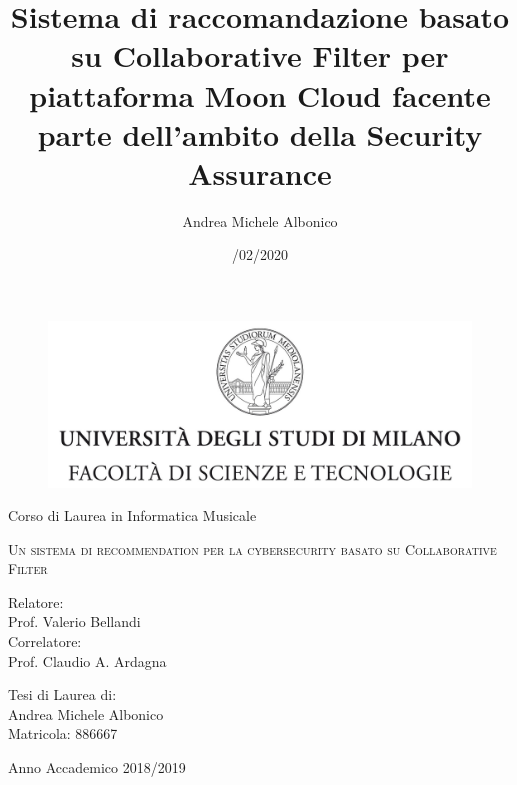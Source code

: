 \documentclass[12pt,fleqn,twoside,a4paper]{book}
\title{Sistema di raccomandazione basato su Collaborative Filter per piattaforma Moon Cloud 
facente parte dell'ambito della Security Assurance}
\author{Andrea Michele Albonico}
\date{/02/2020}
\begin{document}
\frontmatter

\begin{titlepage}
    \begin{figure}
        \centering
        \includegraphics[height=5.0 cm]{logo.jpg}
        \vspace{0.5 cm}
    \end{figure}
    \begin{center}
        {\Large Corso di Laurea in Informatica Musicale}
    \end{center}
    \begin{center}
        \vspace{2 cm}
        {\Large \textsc{Un sistema di recommendation per la cybersecurity basato su Collaborative Filter}}
    \end{center}
    \par
    \vspace{2 cm}
    \begin{flushleft}
        Relatore:\\ Prof. Valerio Bellandi\\
        \noindent Correlatore:\\ Prof. Claudio A. Ardagna
    \end{flushleft}
    \vspace{1 cm}
    \begin{flushright}
        Tesi di Laurea di:\\ Andrea Michele Albonico\\ Matricola: 886667
    \end{flushright}
    \vfill
    \vspace{1.5 cm}
    \begin{center}
        {\Large Anno Accademico 2018/2019}
    \end{center}
\end{titlepage}

\break




\end{document}
